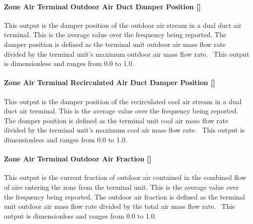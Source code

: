 \paragraph{\texorpdfstring{Zone Air Terminal Outdoor Air Duct Damper Position {[]}}{Zone Air Terminal Outdoor Air Duct Damper Position }}\label{zone-air-terminal-outdoor-air-duct-damper-position}

This output is the damper position of the outdoor air stream in a dual duct air terminal. This is the average value over the frequency being reported. The damper position is defined as the terminal unit outdoor air mass flow rate divided by the terminal unit's maximum outdoor air mass flow rate.~ This output is dimensionless and ranges from 0.0 to 1.0.

\paragraph{\texorpdfstring{Zone Air Terminal Recirculated Air Duct Damper Position {[]}}{Zone Air Terminal Recirculated Air Duct Damper Position }}\label{zone-air-terminal-recirculated-air-duct-damper-position}

This output is the damper position of the recirculated cool air stream in a dual duct air terminal. This is the average value over the frequency being reported. The damper position is defined as the terminal unit cool air mass flow rate divided by the terminal unit's maximum cool air mass flow rate.~ This output is dimensionless and ranges from 0.0 to 1.0.

\paragraph{\texorpdfstring{Zone Air Terminal Outdoor Air Fraction {[]}}{Zone Air Terminal Outdoor Air Fraction }}\label{zone-air-terminal-outdoor-air-fraction}

This output is the current fraction of outdoor air contained in the combined flow of aire entering the zone from the terminal unit. This is the average value over the frequency being reported. The outdoor air fraction is defined as the terminal unit outdoor air mass flow rate divided by the total air mass flow rate.~ This output is dimensionless and ranges from 0.0 to 1.0.

